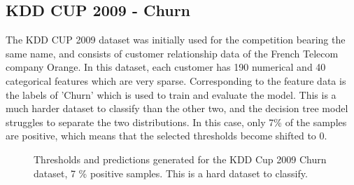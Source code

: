 \documentclass{article}
\begin{document}
\subsection{KDD CUP 2009 - Churn}
    The KDD CUP 2009 dataset was initially used for the competition bearing the same name, and consists of customer relationship data of the French Telecom company Orange. In this dataset, each customer has 190 numerical and 40 categorical features which are very sparse. Corresponding to the feature data is the labels of 'Churn' which is used to train and evaluate the model. This is a much harder dataset to classify than the other two, and the decision tree model struggles to separate the two distributions. In this case, only 7\% of the samples are positive, which means that the selected thresholds become shifted to 0.
\begin{figure}[H]
    \centering
    \scalebox{.8}{}
    \caption{Thresholds and predictions generated for the KDD Cup 2009 Churn dataset, 7 \% positive samples. This is a hard dataset to classify.}
\end{figure}



\end{document}
